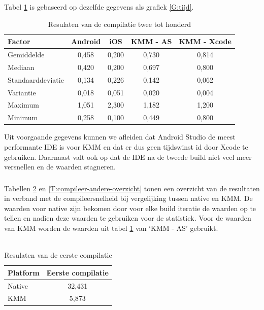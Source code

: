 Tabel \ref{T:compileer-andere} is gebaseerd op dezelfde gegevens als grafiek \ref{G:tijd}.
\begin{table}[H]
    \centering
    \caption{Resulaten van de compilatie twee tot honderd}
    \begin{tabular}{|l|c|c|c|c|}
        \hline
        {\textbf{Factor}} & {\textbf{Android}}  & {\textbf{iOS}} & {\textbf{KMM - AS}} & {\textbf{KMM - Xcode}}\\ \hline \hline
        Gemiddelde&0,458&0,200&0,730&0,814\\ \hline
        Mediaan&0,420&0,200&0,697&0,800\\ \hline
        Standaarddeviatie&0,134&0,226&0,142&0,062\\ \hline
        Variantie&0,018&0,051&0,020&0,004\\ \hline
        Maximum&1,051&2,300&1,182&1,200\\ \hline
        Minimum&0,258&0,100&0,449&0,800\\ \hline
    \end{tabular}
    \label{T:compileer-andere}
\end{table}

Uit voorgaande gegevens kunnen we afleiden dat Android Studio de meest performante IDE is voor KMM en dat er dus geen tijdswinst id door Xcode te gebruiken. Daarnaast valt ook op dat de IDE na de tweede build niet veel meer versnellen en de waarden stagneren.

\subsubsection{}
\label{sec:M-test-compileersnelheid-conclusie}
Tabellen \ref{T:compileer-eerste-overzicht} en \ref{T:compileer-andere-overzicht} tonen een overzicht van de resultaten in verband met de compileersnelheid bij vergelijking tussen native en KMM. De waarden voor native zijn bekomen door voor elke build iteratie de waarden op te tellen en nadien deze waarden te gebruiken voor de statistiek. Voor de waarden van KMM worden de waarden uit tabel \ref{T:compileer-andere} van `KMM - AS' gebruikt.
\\ \\
\begin{table}[H]
    \centering
    \caption{Resulaten van de eerste compilatie}
    \begin{tabular}{|l|c|}
        \hline
        {\textbf{Platform}} & {\textbf{Eerste compilatie}} \\ \hline \hline
        Native&32,431\\ \hline
        KMM&5,873\\ \hline 
    \end{tabular}
    \label{T:compileer-eerste-overzicht}
\end{table}

